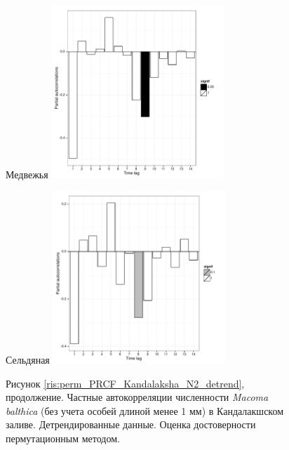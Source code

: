 	\begin{figure}[p]

	\begin{minipage}[b]{.46\linewidth}
	\begin{center}
	{\tiny Медвежья}
	\includegraphics[width=65mm]{../White_Sea/dynamic_N_N1/perm_PRCF_Medvezhya_detrend.pdf}
	\end{center}
	\end{minipage}
%
	\hfil %
%
	\begin{minipage}[b]{.46\linewidth}
	\begin{center}
	{\tiny Сельдяная}
	\includegraphics[width=65mm]{../White_Sea/dynamic_N_N1/perm_PRCF_Seldyanaya_detrend.pdf}
	\end{center}
	\end{minipage}

\begin{center}
Рисунок \ref{ris:perm_PRCF_Kandalaksha_N2_detrend}, продолжение. Частные автокорреляции численности {\it Macoma balthica} (без учета особей длиной менее 1 мм) в Кандалакшском заливе. Детрендированные данные. Оценка достоверности пермутационным методом.
\end{center}
	\end{figure}
